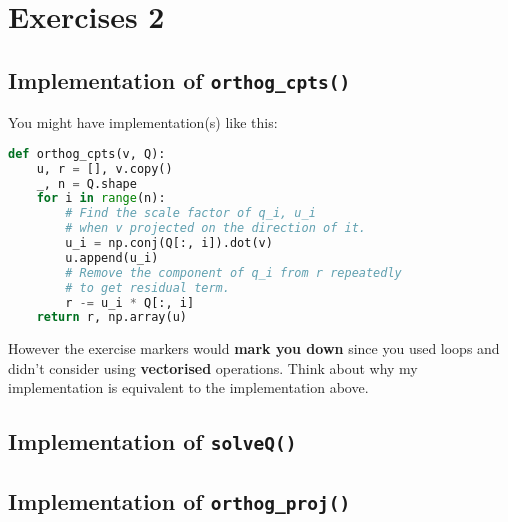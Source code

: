 \section{Exercises 2}
\subsection{Implementation of \texttt{orthog\_cpts()}}
You might have implementation(s) like this:
\begin{lstlisting}[language=Python]
def orthog_cpts(v, Q):
    u, r = [], v.copy()
    _, n = Q.shape
    for i in range(n):
        # Find the scale factor of q_i, u_i
        # when v projected on the direction of it.
        u_i = np.conj(Q[:, i]).dot(v)
        u.append(u_i)
        # Remove the component of q_i from r repeatedly
        # to get residual term.
        r -= u_i * Q[:, i]
    return r, np.array(u)
\end{lstlisting}
However the exercise markers would \textbf{mark you down} since you used loops and didn't consider using \textbf{vectorised} operations.
Think about why my implementation is equivalent to the implementation above.


\subsection{Implementation of \texttt{solveQ()}}


\subsection{Implementation of \texttt{orthog\_proj()}}
